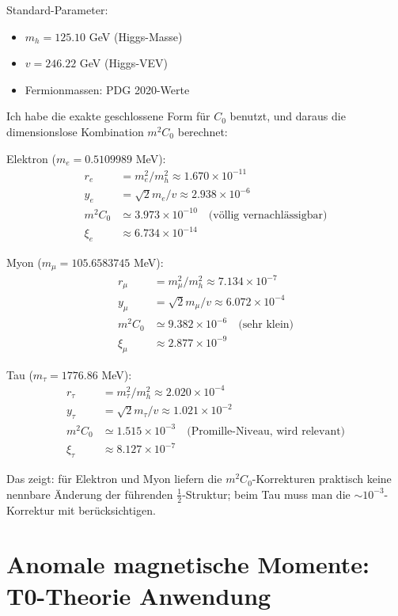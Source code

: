 \documentclass[12pt,a4paper]{article}
\theoremstyle{definition}
\begin{document}
	\begin{numerisch}
		Standard-Parameter:
		\begin{itemize}
			\item $m_h = 125.10$ GeV (Higgs-Masse)
			\item $v = 246.22$ GeV (Higgs-VEV)
			\item Fermionmassen: PDG 2020-Werte
		\end{itemize}
		
		Ich habe die exakte geschlossene Form für $C_0$ benutzt, und daraus die dimensionslose Kombination $m^2C_0$ berechnet:
		
		Elektron ($m_e = 0.5109989$ MeV):
		\begin{align}
			r_e &= m_e^2/m_h^2 \approx 1.670 \times 10^{-11}\\
			y_e &= \sqrt{2} m_e/v \approx 2.938 \times 10^{-6}\\
			m^2C_0 &\simeq 3.973 \times 10^{-10} \quad \text{(völlig vernachlässigbar)}\\
			\xi_e &\approx 6.734 \times 10^{-14}
		\end{align}
		
		Myon ($m_\mu = 105.6583745$ MeV):
		\begin{align}
			r_\mu &= m_\mu^2/m_h^2 \approx 7.134 \times 10^{-7}\\
			y_\mu &= \sqrt{2} m_\mu/v \approx 6.072 \times 10^{-4}\\
			m^2C_0 &\simeq 9.382 \times 10^{-6} \quad \text{(sehr klein)}\\
			\xi_\mu &\approx 2.877 \times 10^{-9}
		\end{align}
		
		Tau ($m_\tau = 1776.86$ MeV):
		\begin{align}
			r_\tau &= m_\tau^2/m_h^2 \approx 2.020 \times 10^{-4}\\
			y_\tau &= \sqrt{2} m_\tau/v \approx 1.021 \times 10^{-2}\\
			m^2C_0 &\simeq 1.515 \times 10^{-3} \quad \text{(Promille-Niveau, wird relevant)}\\
			\xi_\tau &\approx 8.127 \times 10^{-7}
		\end{align}
		
		Das zeigt: für Elektron und Myon liefern die $m^2C_0$-Korrekturen praktisch keine nennbare Änderung der führenden $\frac{1}{2}$-Struktur; beim Tau muss man die $\sim 10^{-3}$-Korrektur mit berücksichtigen.
	\end{numerisch}
	
	\section{Anomale magnetische Momente: T0-Theorie Anwendung}
	
\end{document}
